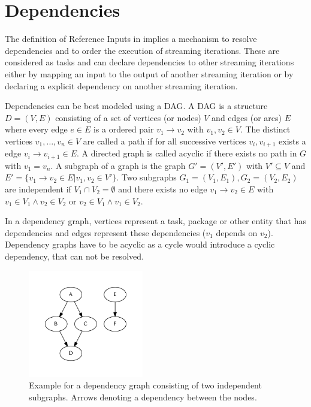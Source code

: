 	\section{Dependencies}
		\label{sec:stream:dependencies}
		The definition of Reference Inputs in  implies a mechanism to resolve dependencies and to order the execution of streaming iterations. These are considered as tasks and can declare dependencies to other streaming iterations either by mapping an input to the output of another streaming iteration or by declaring a explicit dependency on another streaming iteration.

		Dependencies can be best modeled using a \ac{DAG}. A \ac{DAG} is a structure $D=(V, E)$ consisting of a set of vertices (or nodes) $V$ and edges (or arcs) $E$ where every edge $e\in E$ is a ordered pair $v_1 \rightarrow v_2$ with $v_1, v_2 \in V$. The distinct vertices $v_1,\dots,v_n\in V$ are called a path if for all successive vertices $v_i, v_{i+1}$ exists a edge $v_i \rightarrow v_{i+1} \in E$. A directed graph is called acyclic if there exists no path in $G$ with $v_1 = v_n$. A subgraph of a graph is the graph $G' = (V', E')$ with $V'\subseteq V$ and $E' = \{v_1 \rightarrow v_2 \in E | v_1, v_2\in V'\}$. Two subgraphs $G_1 = (V_1, E_1), G_2 = (V_2, E_2)$ are independent if $V_1 \cap V_2 = \emptyset$ and there exists no edge $v_1\rightarrow v_2\in E$ with $v_1\in V_1 \wedge v_2\in V_2$ or $v_2\in V_1 \wedge v_1\in V_2$.

		In a dependency graph, vertices represent a task, package or other entity that has dependencies and edges represent these dependencies ($v_1$ depends on $v_2$). Dependency graphs have to be acyclic as a cycle would introduce a cyclic dependency, that can not be resolved.

		\begin{figure}[!htb]
			\centering
			\includegraphics[width=0.44694533762057875\textwidth]{figures/unordered-graph.pdf} %
			\caption{\label{fig:graph:unordered}Example for a dependency graph consisting of two independent subgraphs. Arrows denoting a dependency between the nodes.}
		\end{figure}


